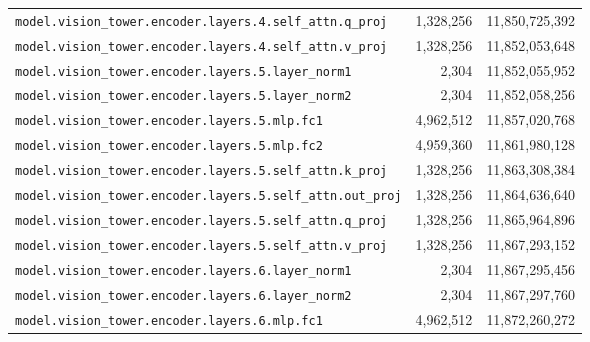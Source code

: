 \documentclass[10pt,a4paper]{article}
\theoremstyle{definition}
\begin{document}
\begin{appendices}
\begin{longtable}{p{9.5cm}rr}
\texttt{model.\allowbreak{}vision\_tower.\allowbreak{}encoder.\allowbreak{}layers.\allowbreak{}4.\allowbreak{}self\_attn.\allowbreak{}q\_proj} & 1,328,256 & 11,850,725,392 \\
\texttt{model.\allowbreak{}vision\_tower.\allowbreak{}encoder.\allowbreak{}layers.\allowbreak{}4.\allowbreak{}self\_attn.\allowbreak{}v\_proj} & 1,328,256 & 11,852,053,648 \\
\texttt{model.\allowbreak{}vision\_tower.\allowbreak{}encoder.\allowbreak{}layers.\allowbreak{}5.\allowbreak{}layer\_norm1} & 2,304 & 11,852,055,952 \\
\texttt{model.\allowbreak{}vision\_tower.\allowbreak{}encoder.\allowbreak{}layers.\allowbreak{}5.\allowbreak{}layer\_norm2} & 2,304 & 11,852,058,256 \\
\texttt{model.\allowbreak{}vision\_tower.\allowbreak{}encoder.\allowbreak{}layers.\allowbreak{}5.\allowbreak{}mlp.\allowbreak{}fc1} & 4,962,512 & 11,857,020,768 \\
\texttt{model.\allowbreak{}vision\_tower.\allowbreak{}encoder.\allowbreak{}layers.\allowbreak{}5.\allowbreak{}mlp.\allowbreak{}fc2} & 4,959,360 & 11,861,980,128 \\
\texttt{model.\allowbreak{}vision\_tower.\allowbreak{}encoder.\allowbreak{}layers.\allowbreak{}5.\allowbreak{}self\_attn.\allowbreak{}k\_proj} & 1,328,256 & 11,863,308,384 \\
\texttt{model.\allowbreak{}vision\_tower.\allowbreak{}encoder.\allowbreak{}layers.\allowbreak{}5.\allowbreak{}self\_attn.\allowbreak{}out\_proj} & 1,328,256 & 11,864,636,640 \\
\texttt{model.\allowbreak{}vision\_tower.\allowbreak{}encoder.\allowbreak{}layers.\allowbreak{}5.\allowbreak{}self\_attn.\allowbreak{}q\_proj} & 1,328,256 & 11,865,964,896 \\
\texttt{model.\allowbreak{}vision\_tower.\allowbreak{}encoder.\allowbreak{}layers.\allowbreak{}5.\allowbreak{}self\_attn.\allowbreak{}v\_proj} & 1,328,256 & 11,867,293,152 \\
\texttt{model.\allowbreak{}vision\_tower.\allowbreak{}encoder.\allowbreak{}layers.\allowbreak{}6.\allowbreak{}layer\_norm1} & 2,304 & 11,867,295,456 \\
\texttt{model.\allowbreak{}vision\_tower.\allowbreak{}encoder.\allowbreak{}layers.\allowbreak{}6.\allowbreak{}layer\_norm2} & 2,304 & 11,867,297,760 \\
\texttt{model.\allowbreak{}vision\_tower.\allowbreak{}encoder.\allowbreak{}layers.\allowbreak{}6.\allowbreak{}mlp.\allowbreak{}fc1} & 4,962,512 & 11,872,260,272 \\

\end{longtable}
\end{appendices}
\end{document}

